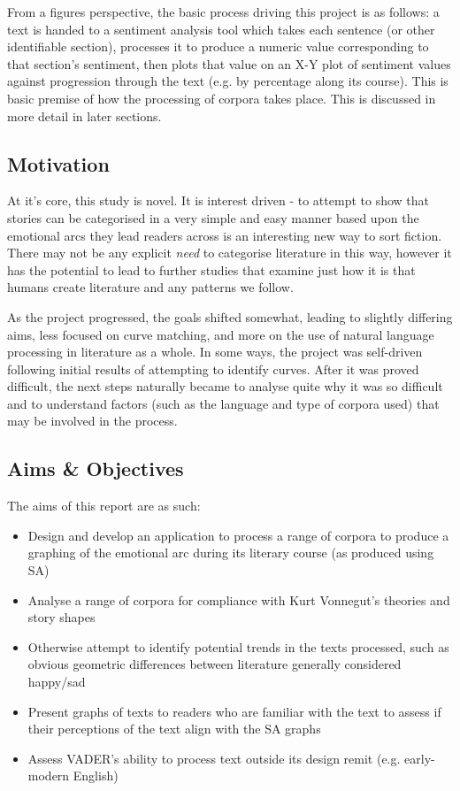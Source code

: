 \documentclass{article}
\begin{document}
{        From a figures perspective, the basic process driving this project is as follows: a text is handed to a sentiment analysis tool which takes each sentence (or other identifiable section), processes it to produce a numeric value corresponding to that section's sentiment, then plots that value on an X-Y plot of sentiment values against progression through the text (e.g. by percentage along its course). This is basic premise of how the processing of corpora takes place. This is discussed in more detail in later sections.
    \subsection{Motivation}
        At it's core, this study is novel. It is interest driven - to attempt to show that stories can be categorised in a very simple and easy manner based upon the emotional arcs they lead readers across is an interesting new way to sort fiction. There may not be any explicit \textit{need} to categorise literature in this way, however it has the potential to lead to further studies that examine just how it is that humans create literature and any patterns we follow.

        As the project progressed, the goals shifted somewhat, leading to slightly differing aims, less focused on curve matching, and more on the use of natural language processing in literature as a whole. In some ways, the project was self-driven following initial results of attempting to identify curves. After it was proved difficult, the next steps naturally became to analyse quite why it was so difficult and to understand factors (such as the language and type of corpora used) that may be involved in the process.
    \subsection{Aims \& Objectives}
        The aims of this report are as such:
        \begin{itemize}
            \item Design and develop an application to process a range of corpora to produce a graphing of the emotional arc during its literary course (as produced using SA)
            \item Analyse a range of corpora for compliance with Kurt Vonnegut’s theories and story shapes
            \item Otherwise attempt to identify potential trends in the texts processed, such as obvious geometric differences between literature generally considered happy/sad
            \item Present graphs of texts to readers who are familiar with the text to assess if their perceptions of the text align with the SA graphs
            \item Assess VADER's ability to process text outside its design remit (e.g. early-modern English)
        \end{itemize}
}
\end{document}
